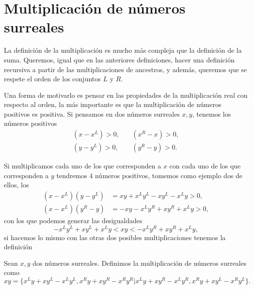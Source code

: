 \section {Multiplicación de números surreales}
    
    La definici\'on de la multiplicaci\'on es mucho m\'as compleja que la definici\'on de la suma. Queremos, igual que en las anteriores definiciones, hacer una definici\'on recursiva a partir de las multiplicaciones de ancestros, y adem\'as, queremos que se respete el orden de los conjuntos $L$ y $R$.

    Una forma de motivarlo es pensar en las propiedades de la multiplicaci\'on real con respecto al orden, la m\'as importante es que la multiplicaci\'on de n\'umeros positivos es positiva. Si pensamos en dos n\'umeros surreales $x,y$, tenemos los n\'umeros positivos
    \begin{align*}
        (x-x^L) > 0, \quad & (x^R-x)>0, \\
        (y-y^L) > 0, \quad & (y^R-y)>0.
    \end{align*}

    Si multiplicamos cada uno de los que corresponden a $x$ con cada uno de los que corresponden a $y$ tendremos $4$ n\'umeros positivos, tomemos como ejemplo dos de ellos, los
    \begin{align*}
        (x-x^L)(y-y^L) &= xy + x^Ly^L - xy^L - x^Ly > 0,\\
        (x-x^L)(y^R-y) &= -xy -x^Ly^R + xy^R + x^Ly > 0,
    \end{align*}
    con los que podemos generar las desigualdades
    \[
        - x^Ly^L + xy^L + x^Ly < xy < -x^Ly^R + xy^R + x^Ly,
    \]
    si hacemos lo mismo con las otras dos posibles multiplicaciones tenemos la definici\'on

    \begin{definition}[Multiplicaci\'on]
        Sean $x, y$ dos n\'umeros surreales. Definimos la multiplicaci\'on de n\'umeros surreales como
        \[
            xy = \big\{x^Ly+xy^L-x^Ly^L, x^Ry+xy^R-x^Ry^R\big|x^Ly+xy^R-x^Ly^R, x^Ry+xy^L-x^Ry^L\big\}.
        \]
    \end{definition}


